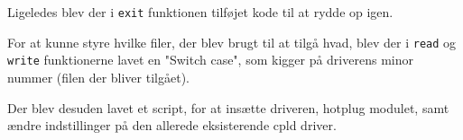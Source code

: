 %
%
%

Ligeledes blev der i \texttt{exit} funktionen tilføjet kode til at rydde op igen.

For at kunne styre hvilke filer, der blev brugt til at tilgå hvad, blev der i \texttt{read} og \texttt{write} funktionerne lavet en "Switch case", som kigger på driverens minor nummer (filen der bliver tilgået).
%

Der blev desuden lavet et script, for at insætte driveren, hotplug modulet, samt ændre indstillinger på den allerede eksisterende cpld driver.
%
%
